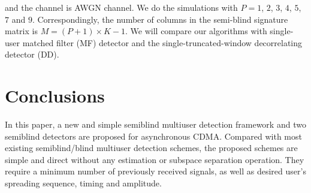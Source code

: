 \documentclass[a4paper,10pt,fleqn, twocolumn]{IEEETran}
\begin{document}
\begin{figure} \label{BER_P}
\end{figure}

\noindent and the channel is AWGN channel. We do the simulations
with $P=1$, $2$, $3$, $4$, $5$, $7$ and $9$. Correspondingly, the
number of columns in the semi-blind signature matrix is
$M=(P+1)\times K-1$. We will compare our algorithms with
single-user matched filter (MF) detector and the
single-truncated-window decorrelating detector (DD).
\section{Conclusions}
In this paper, a new and simple semiblind multiuser detection
framework and two semiblind detectors are proposed for
asynchronous CDMA. Compared with most existing semiblind/blind
multiuser detection schemes, the proposed schemes are simple and
direct without any estimation or subspace separation operation.
They require a minimum number of previously received signals, as
well as desired user's spreading sequence, timing and amplitude.

\small


\end{document}
